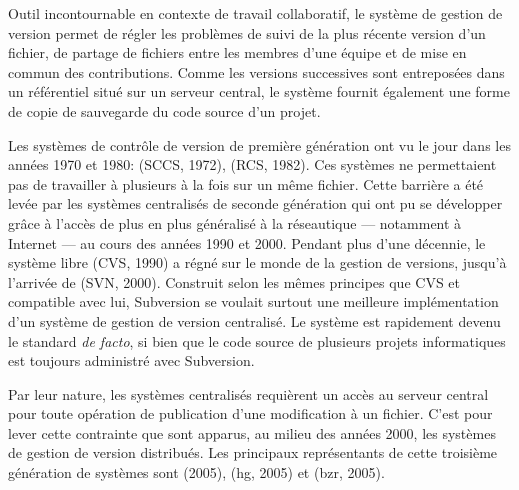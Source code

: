 Outil incontournable en contexte de travail collaboratif, le système
de gestion de version permet de régler les problèmes de suivi de la
plus récente version d'un fichier, de partage de fichiers entre les
membres d'une équipe et de mise en commun des contributions. Comme les
versions successives sont entreposées dans un référentiel situé sur un
serveur central, le système fournit également une forme de copie de
sauvegarde du code source d'un projet.


Les systèmes de contrôle de version de première génération ont vu le
jour dans les années 1970 et 1980:
 (SCCS, 1972),
 (RCS, 1982). Ces systèmes ne permettaient pas de
travailler à plusieurs à la fois sur un même fichier. Cette barrière a
été levée par les systèmes centralisés de seconde génération qui ont
pu se développer grâce à l'accès de plus en plus généralisé à la
réseautique --- notamment à Internet --- au cours des années 1990 et
2000. Pendant plus d'une décennie, le système libre
 (CVS, 1990) a régné sur le monde de la gestion
de versions, jusqu'à l'arrivée de
 (SVN, 2000). Construit selon les mêmes principes que
CVS et compatible avec lui, Subversion se voulait surtout une
meilleure implémentation d'un système de gestion de version
centralisé. Le système est rapidement devenu le standard \emph{de
  facto}, si bien que le code source de plusieurs projets
informatiques est toujours administré avec Subversion.

Par leur nature, les systèmes centralisés requièrent un accès au
serveur central pour toute opération de publication d'une modification
à un fichier. C'est pour lever cette contrainte que sont apparus, au
milieu des années 2000, les systèmes de gestion de version distribués.
Les principaux représentants de cette troisième génération de systèmes
sont  (2005),
 (hg,
2005) et
(bzr, 2005).

